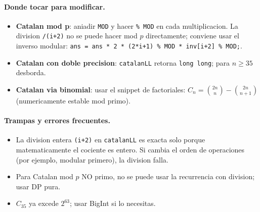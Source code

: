 \paragraph{Donde tocar para modificar.}
\begin{itemize}\setlength\itemsep{0pt}
	\item \textbf{Catalan mod p}: aniadir \texttt{MOD} y hacer \texttt{\% MOD} en cada multiplicacion. La division \texttt{/(i+2)} no se puede hacer mod $p$ directamente; conviene usar el inverso modular: \texttt{ans = ans * 2 * (2*i+1) \% MOD * inv[i+2] \% MOD;}.
	\item \textbf{Catalan con doble precision}: \texttt{catalanLL} retorna \texttt{long long}; para $n \ge 35$ desborda.
	\item \textbf{Catalan via binomial}: usar el snippet de factoriales: $C_n = \binom{2n}{n} - \binom{2n}{n+1}$ (numericamente estable mod primo).
\end{itemize}

\paragraph{Trampas y errores frecuentes.}
\begin{itemize}\setlength\itemsep{0pt}
	\item La division entera \texttt{(i+2)} en \texttt{catalanLL} es exacta solo porque matematicamente el cociente es entero. Si cambia el orden de operaciones (por ejemplo, modular primero), la division falla.
	\item Para Catalan mod $p$ NO primo, no se puede usar la recurrencia con division; usar DP pura.
	\item $C_{35}$ ya excede $2^{63}$; usar BigInt si lo necesitas.
\end{itemize}

